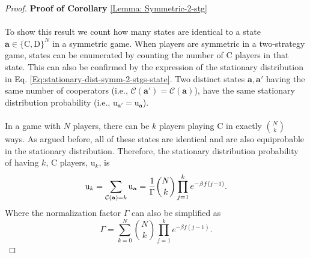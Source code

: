 \documentclass[11pt]{article}
\theoremstyle{plainCl1}
\theoremstyle{plainCl2}
\newcommand{\abf}{\mathbf{a}}
\newcommand{\C}{\mathrm{C}}
\newcommand{\D}{\mathrm{D}}
\begin{document}
\begin{proof}
\textbf{Proof of Corollary} \ref{Lemma: Symmetric-2-stg} \\ \\
To show this result we count how many states are identical to a state $\abf \in \{\C,\D\}^N$ in a symmetric game. When players are symmetric in a two-strategy game, states can be enumerated by counting the number of $\C$ players in that state. This can also be confirmed by the expression of the stationary distribution in Eq. \ref{Eq:stationary-dist-symm-2-stgs-state}. Two distinct states $\abf, \abf'$ having the same number of cooperators (i.e., $\mathcal{C}(\abf') = \mathcal{C}(\abf)$), have the same stationary distribution probability (i.e., $\mathrm{u}_{\abf'} = \mathrm{u}_{\abf}$).
\\ \\ 
\noindent In a game with $N$ players, there can be $k$ players playing $\C$ in exactly $N \choose k$ ways. As argued before, all of these states are identical and are also equiprobable in the stationary distribution. Therefore, the stationary distribution probability of having $k$, $\C$ players, $\mathrm{u}_{k}$, is
\begin{equation}
\mathrm{u}_{k} = \sum_{\mathcal{C(\abf)} = k} \mathrm{u}_\abf = \frac{1}{\Gamma} {N \choose k} \prod_{j=1}^k e^{-\beta f(j-1)} . \\[10pt]
\end{equation} 
\noindent Where the normalization factor $\Gamma$ can also be simplified as
\begin{equation}
\Gamma = \sum_{k=0}^N {N \choose k} \prod_{j=1}^k e^{-\beta f(j-1)} .
\end{equation}
\end{proof}
\end{document}
